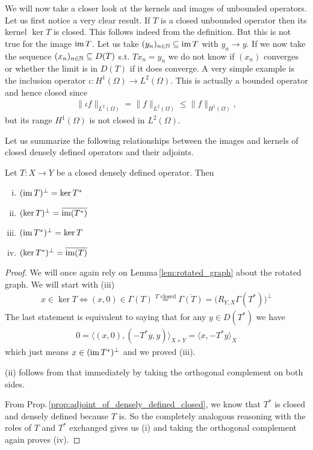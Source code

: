 \documentclass[../master_thesis.tex]{subfiles}
\begin{document}
We will now take a closer look at the kernels and images of unbounded operators.
Let us first notice a very clear result. If $T$ is a closed unbounded operator 
then its kernel $\ker T$ is closed. This follows indeed from the definition. 
But this is not true for the image $\operatorname{im} T$. Let us take
$(y_n)_{n \in \mathbb{N}} \subseteq \operatorname{im} T$ with $y_n \rightarrow y$.
If we now take the sequence $(x_n)_{n \in \mathbb{N}} \subseteq D(T)$
s.t. $Tx_n = y_n$ we do not know if $(x_n)$ converges or 
whether the limit is in $D(T)$ if it does converge. 
A very simple example is the inclusion operator
$\iota: H^1(\Omega) \rightarrow L^2(\Omega)$. This is actually a bounded 
operator and hence closed since 
\begin{align*}
    \lVert \iota f \rVert _{L^2(\Omega)} 
    = \lVert f \rVert _{L^2(\Omega)} 
    \leq \lVert f \rVert _{H^1(\Omega)},
\end{align*}
but its range $H^1(\Omega)$ is not closed in $L^2(\Omega)$.

Let us summarize the following relationships between the images and kernels 
of closed densely defined operators and their adjoints.

\begin{proposition}\label{prop:kernel_image_adjoint}
    Let $T: X \rightarrow Y$ be a closed densely defined operator. Then
    \begin{enumerate}[(i)]
        \item $(\operatorname{im} T)^\perp = \ker T^*$
        \item $(\ker T)^\perp = \overline{\operatorname{im}(T^*)}$
        \item $(\operatorname{im} T^*)^\perp = \ker T$
        \item $(\ker T^*)^\perp = \overline{\operatorname{im}(T)}$
    \end{enumerate}
\end{proposition}
\begin{proof}
    We will once again rely on Lemma\,\ref{lem:rotated_graph} about the 
    rotated graph. We will start with (iii)
    \begin{align*}
        x \in \ker T \Leftrightarrow (x,0) \in \Gamma(T) 
        \stackrel{\text{$T$ closed}}{=} \overline{\Gamma(T)} 
        = \big( R_{Y,X}\Gamma(T^*) \big)^\perp 
    \end{align*}
    The last statement is equivalent to saying that for any $y \in D(T^*)$ 
    we have 
    \begin{align*}
        0 = \langle (x,0), (-T^*y,y) \rangle_{X \times Y}
        = \langle x, -T^*y \rangle_X
    \end{align*}
    which just means $x \in (\operatorname{im} T^*)^\perp$ and we proved (iii).

    (ii) follows from that immediately by taking the orthogonal complement 
    on both sides.

    From Prop.\,\ref{prop:adjoint_of_densely_defined_closed}, 
    we know that $T^*$ is closed and densely defined because $T$
    is. So the completely analogous reasoning with the roles of $T$ and $T^*$
    exchanged gives us (i) and taking the orthogonal complement again 
    proves (iv).
\end{proof}
\end{document}
